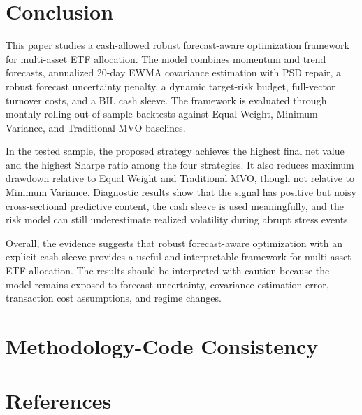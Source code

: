 \documentclass[11pt]{article}
\begin{document}
\section{Conclusion}
\label{sec:conclusion}

This paper studies a cash-allowed robust forecast-aware optimization framework for
multi-asset ETF allocation. The model combines momentum and trend forecasts,
annualized 20-day EWMA covariance estimation with PSD repair, a robust forecast
uncertainty penalty, a dynamic target-risk budget, full-vector turnover costs, and a
BIL cash sleeve. The framework is evaluated through monthly rolling out-of-sample
backtests against Equal Weight, Minimum Variance, and Traditional MVO baselines.

In the tested sample, the proposed strategy achieves the highest final net value and
the highest Sharpe ratio among the four strategies. It also reduces maximum drawdown
relative to Equal Weight and Traditional MVO, though not relative to Minimum
Variance. Diagnostic results show that the signal has positive but noisy
cross-sectional predictive content, the cash sleeve is used meaningfully, and the
risk model can still underestimate realized volatility during abrupt stress events.

Overall, the evidence suggests that robust forecast-aware optimization with an
explicit cash sleeve provides a useful and interpretable framework for multi-asset
ETF allocation. The results should be interpreted with caution because the model
remains exposed to forecast uncertainty, covariance estimation error, transaction
cost assumptions, and regime changes.

\appendix

\section{Methodology-Code Consistency}

\MethodologyCodeConsistencyTable

\section{References}
\end{document}
